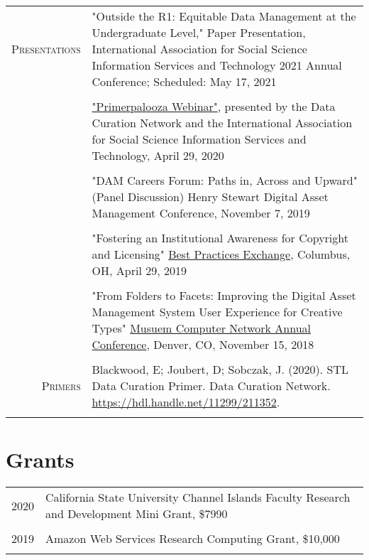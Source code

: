 \documentclass[a4paper,10pt]{article}
\begin{document}
\begin{tabular}{r|p{11cm}}
\textsc{Presentations}
 & "Outside the R1: Equitable Data Management at the Undergraduate Level," Paper Presentation, International Association for Social Science Information Services and Technology 2021 Annual Conference; Scheduled: May 17, 2021
\\&\\
 & {\href{https://youtu.be/nw_Tk62-6mc}{"Primerpalooza Webinar"}, presented by the Data Curation Network and the International Association for Social Science Information Services and Technology, April 29, 2020}
\\&\\
  & "DAM Careers Forum: Paths in, Across and Upward" (Panel Discussion) Henry Stewart Digital Asset Management Conference, November 7, 2019
\\&\\
 & "Fostering an Institutional Awareness for Copyright and Licensing" \href{https://bpexchange.wordpress.com/2019-conference/2019-schedule/}{Best Practices Exchange}, Columbus, OH, April 29, 2019
\\&\\
 & "From Folders to Facets: Improving the Digital Asset Management System User Experience for Creative Types" \href{https://mcn.edu/conferences/past-conferences/}{Musuem Computer Network Annual Conference}, Denver, CO, November 15, 2018\\\multicolumn{2}{c}{} \\
 
 \textsc{Primers}
 &Blackwood, E; Joubert, D; Sobczak, J. (2020). STL Data Curation Primer. Data Curation Network. \href{https://hdl.handle.net/11299/211352}{https://hdl.handle.net/11299/211352}.\\\multicolumn{2}{c}{} \\
 
\end{tabular}
\section{Grants}
\begin{tabular}{r|p{11cm}}
 \textsc{2020}
& California State University Channel Islands Faculty Research and Development Mini Grant, \$7990
\\&\\
 \textsc{2019}
& Amazon Web Services Research Computing Grant, \$10,000
\\\multicolumn{2}{c}{} \\
\end{tabular}
\end{document}

